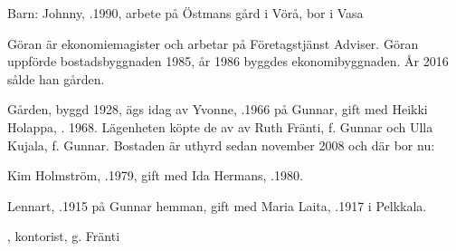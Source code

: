Barn: Johnny, .1990, arbete på Östmans gård i Vörå, bor i Vasa

Göran är ekonomiemagister och arbetar på Företagstjänst Adviser. Göran uppförde bostadsbyggnaden 1985, år 1986 byggdes ekonomibyggnaden. År 2016 sålde han gården.



%



%
Gården, byggd 1928, ägs idag av Yvonne, .1966 på Gunnar, gift med Heikki Holappa, . 1968. Lägenheten köpte de av av Ruth Fränti, f. Gunnar och Ulla Kujala, f. Gunnar. Bostaden är uthyrd sedan november 2008 och där bor nu:

Kim Holmström, .1979, gift med Ida Hermans, .1980.
\begin{jhchildren}
  \item {}
  \item {}
  \item {}
\end{jhchildren}


%
Lennart, .1915 på Gunnar hemman, gift med Maria Laita, .1917 i Pelkkala.
\begin{jhchildren}
  \item {}
  \item {}
  \item {}
  \item {}, kontorist, g. Fränti
  \item {}
  \item {}
\end{jhchildren}

